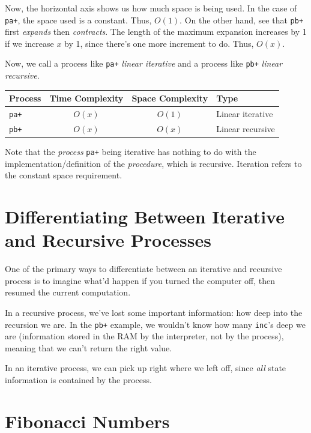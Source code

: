 \documentclass[9pt]{report}
\begin{document}
Now, the horizontal axis shows us how much space is being used. In
the case of \texttt{pa+}, the space used is a constant. Thus, \(O(1)\). On
the other hand, see that \texttt{pb+} first \emph{expands} then \emph{contracts}.
The length of the maximum expansion increases by 1 if we increase
\(x\) by 1, since there's one more increment to do. Thus, \(O(x)\).

Now, we call a process like \texttt{pa+} \emph{linear iterative} and a process
like \texttt{pb+} \emph{linear recursive}.

\begin{center}
\begin{tabular}{lccl}
\toprule
Process & Time Complexity & Space Complexity & Type\\
\midrule
\texttt{pa+} & \(O(x)\) & \(O(1)\) & Linear iterative\\
\texttt{pb+} & \(O(x)\) & \(O(x)\) & Linear recursive\\
\bottomrule
\end{tabular}
\end{center}

Note that the \emph{process} \texttt{pa+} being iterative has nothing to do
with the implementation/definition of the \emph{procedure}, which is
recursive. Iteration refers to the constant space requirement.

\section{Differentiating Between Iterative and Recursive Processes}
\label{sec:org52c88dd}

One of the primary ways to differentiate between an iterative and
recursive process is to imagine what'd happen if you turned the
computer off, then resumed the current computation.

In a recursive process, we've lost some important information: how
deep into the recursion we are. In the \texttt{pb+} example, we wouldn't
know how many \texttt{inc}'s deep we are (information stored in the RAM by
the interpreter, not by the process), meaning that we can't return
the right value.

In an iterative process, we can pick up right where we left off,
since \emph{all} state information is contained by the process.

\section{Fibonacci Numbers}
\label{sec:orge3cfadc}
\end{document}
